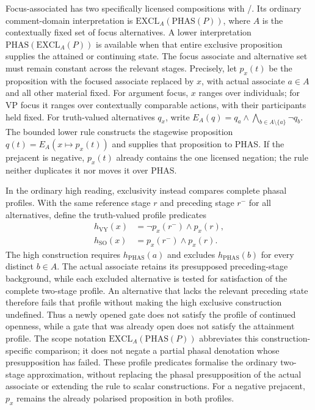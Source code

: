 Focus-associated  has two specifically licensed
compositions with /. Its ordinary comment-domain interpretation
is $\mathrm{EXCL}_{A}(\mathrm{PHAS}(P))$, where $A$ is the contextually fixed
set of focus alternatives. A lower interpretation
$\mathrm{PHAS}(\mathrm{EXCL}_{A}(P))$ is available when that entire exclusive
proposition supplies the attained or continuing state. The focus associate
and alternative set must remain constant across the relevant stages.
Precisely, let $p_x(t)$ be the proposition with the focused associate replaced
by $x$, with actual associate $a\in A$ and all other material fixed.
For argument focus, $x$ ranges over individuals; for VP focus it ranges over
contextually comparable actions, with their participants held fixed. For
truth-valued alternatives $q_x$, write
$E_A(q)=q_a\wedge\bigwedge_{b\in A\setminus\{a\}}\neg q_b$.
The bounded lower rule constructs the stagewise proposition
$q(t)=E_A(x\mapsto p_x(t))$ and supplies that proposition to PHAS.
If the prejacent is negative, $p_x(t)$ already contains the one licensed
negation; the rule neither duplicates it nor moves it over PHAS.

In the ordinary high reading, exclusivity instead compares complete phasal
profiles. With the same reference stage $r$ and preceding stage $r^{-}$ for
all alternatives, define the truth-valued profile predicates
\[
\begin{aligned}
h_{\mathrm{VY}}(x)&=\neg p_x(r^{-})\wedge p_x(r),\\
h_{\mathrm{SO}}(x)&=p_x(r^{-})\wedge p_x(r).
\end{aligned}
\]
The high construction requires $h_{\mathrm{PHAS}}(a)$ and excludes
$h_{\mathrm{PHAS}}(b)$ for every distinct $b\in A$. The actual associate
retains its presupposed preceding-stage background, while each excluded
alternative is tested for satisfaction of the complete two-stage profile.
An alternative that lacks the relevant preceding state therefore fails that
profile without making the high exclusive construction undefined. Thus a
newly opened gate does not satisfy the profile of continued openness,
while a gate that was already open does not satisfy the attainment profile. The scope notation
$\mathrm{EXCL}_{A}(\mathrm{PHAS}(P))$ abbreviates this construction-specific
comparison; it does not negate a partial phasal denotation whose
presupposition has failed. These profile predicates formalise the ordinary
two-stage approximation, without replacing the phasal presupposition of the
actual associate or extending the rule to scalar constructions. For a negative
prejacent, $p_x$ remains the already polarised proposition in both profiles.

